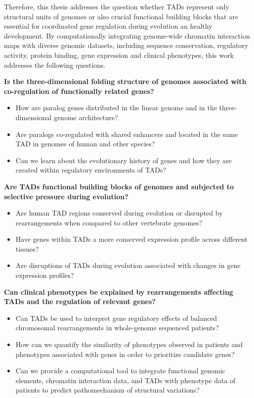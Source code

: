 \documentclass[a4paper,twoside=true,openright,parskip=full,chapterprefix=true,11pt,headings=normal,bibliography=totoc,listof=totoc,titlepage=on,captions=tableabove,draft=false]{scrreprt}
\providecommand{\tightlist}{%
  \setlength{\itemsep}{0pt}\setlength{\parskip}{0pt}}
\theoremstyle{definition}
\theoremstyle{definition}
\theoremstyle{definition}
\theoremstyle{remark}
\begin{document}
Therefore, this thesis addresses the question whether TADs represent
only structural units of genomes or also crucial functional building
blocks that are essential for coordinated gene regulation during
evolution an healthy development. By computationally integrating
genome-wide chromatin interaction maps with diverse genomic datasets,
including sequence conservation, regulatory activity, protein binding,
gene expression and clinical phenotypes, this work addresses the
following questions.

\textbf{Is the three-dimensional folding structure of genomes associated
with co-regulation of functionally related genes?}

\begin{itemize}
\tightlist
\item
  How are paralog genes distributed in the linear genome and in the
  three-dimensional genome architecture?
\item
  Are paralogs co-regulated with shared enhancers and located in the
  same TAD in genomes of human and other species?
\item
  Can we learn about the evolutionary history of genes and how they are
  created within regulatory environments of TADs?
\end{itemize}

\textbf{Are TADs functional building blocks of genomes and subjected to
selective pressure during evolution?}

\begin{itemize}
\tightlist
\item
  Are human TAD regions conserved during evolution or disrupted by
  rearrangements when compared to other vertebrate genomes?
\item
  Have genes within TADs a more conserved expression profile across
  different tissues?
\item
  Are disruptions of TADs during evolution associated with changes in
  gene expression profiles?
\end{itemize}

\textbf{Can clinical phenotypes be explained by rearrangements affecting
TADs and the regulation of relevant genes?}

\begin{itemize}
\tightlist
\item
  Can TADs be used to interpret gene regulatory effects of balanced
  chromosomal rearrangements in whole-genome sequenced patients?
\item
  How can we quantify the similarity of phenotypes observed in patients
  and phenotypes associated with genes in order to prioritize candidate
  genes?
\item
  Can we provide a computational tool to integrate functional genomic
  elements, chromatin interaction data, and TADs with phenotype data of
  patients to predict pathomechanism of structural variations?
\end{itemize}
\end{document}
